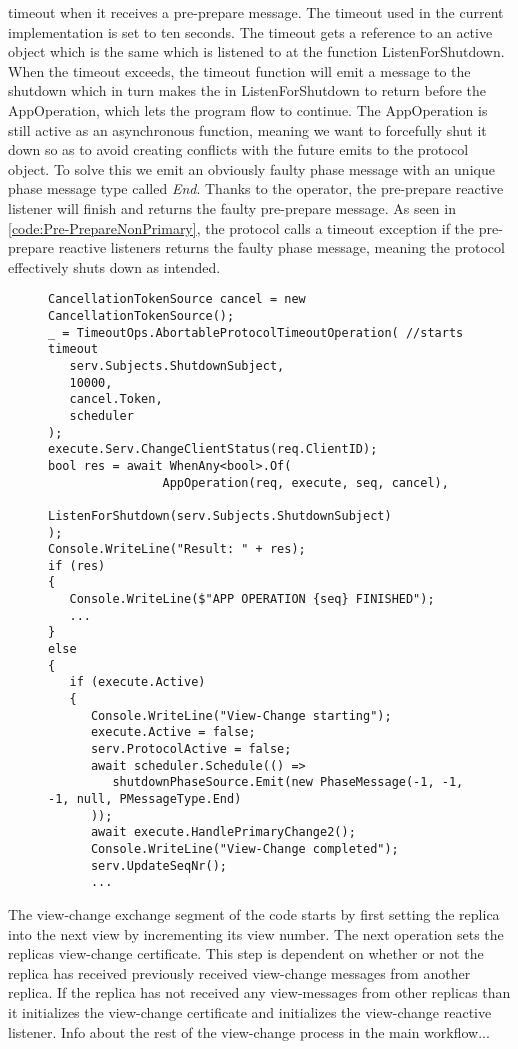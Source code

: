 timeout when it receives a pre-prepare message. The timeout used in the current implementation is set to ten seconds. The timeout gets a reference to an active  object which is the same  which is listened to at the function ListenForShutdown. When the timeout exceeds, the timeout function will emit a message to the shutdown  which in turn makes the  in ListenForShutdown to return before the AppOperation, which lets the program flow to continue. The AppOperation is still active as an asynchronous function, meaning we want to forcefully shut it down so as to avoid creating conflicts with the future emits to the protocol  object. To solve this we emit an obviously faulty phase message with an unique phase message type called \emph{End}. Thanks to the  operator, the pre-prepare reactive listener will finish and returns the faulty pre-prepare message. As seen in \autoref{code:Pre-PrepareNonPrimary}, the protocol calls a timeout exception if the pre-prepare reactive listeners returns the faulty phase message, meaning the protocol effectively shuts down as intended.   

\begin{figure}[H]
	\centering
	\begin{lstlisting}[label = code:timeout, caption=Handling timeout for the normal protocol workflow, captionpos = b, basicstyle=\scriptsize]
CancellationTokenSource cancel = new CancellationTokenSource();
_ = TimeoutOps.AbortableProtocolTimeoutOperation( //starts timeout
   serv.Subjects.ShutdownSubject,
   10000,
   cancel.Token,
   scheduler
);
execute.Serv.ChangeClientStatus(req.ClientID);
bool res = await WhenAny<bool>.Of(
                AppOperation(req, execute, seq, cancel),
                ListenForShutdown(serv.Subjects.ShutdownSubject)
);
Console.WriteLine("Result: " + res);
if (res)
{
   Console.WriteLine($"APP OPERATION {seq} FINISHED");
   ...
}
else
{
   if (execute.Active)
   {
      Console.WriteLine("View-Change starting");
      execute.Active = false;
      serv.ProtocolActive = false;
      await scheduler.Schedule(() =>
         shutdownPhaseSource.Emit(new PhaseMessage(-1, -1, -1, null, PMessageType.End)
      ));
      await execute.HandlePrimaryChange2(); 
      Console.WriteLine("View-Change completed");
      serv.UpdateSeqNr();
      ...
    \end{lstlisting}
\end{figure} 
 
The view-change exchange segment of the code starts by first setting the replica into the next view by incrementing its view number. The next operation sets the replicas view-change certificate. This step is dependent on whether or not the replica has received previously received view-change messages from another replica. If the replica has not received any view-messages from other replicas than it initializes the view-change certificate and initializes the view-change reactive listener. Info about the rest of the view-change process in the main workflow...

